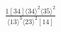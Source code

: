 \documentclass[varwidth, border=5pt]{standalone}
\begin{document}
\begin{my}
$\begin{gathered}
\scriptscriptstyle\frac{1[34]⟨34⟩^2⟨35⟩^2}{⟨13⟩^3⟨23⟩^2[14]}
\end{gathered}$
\end{my}
\end{document}
